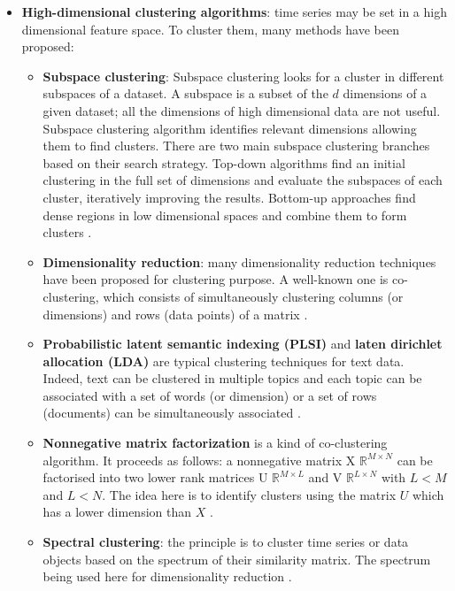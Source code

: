 \begin{itemize}
\item  \textbf{High-dimensional clustering algorithms}: time series may be set in a high dimensional feature space. To cluster them, many methods have been proposed:

\begin{itemize}
	\item  \textbf{Subspace clustering}: Subspace clustering looks for a cluster in 	different subspaces of a dataset.  A subspace is a subset of the $d$ dimensions 		of a given dataset; all the dimensions of high dimensional data are not useful. 	Subspace clustering algorithm identifies relevant dimensions allowing them to 		find clusters. There are two main subspace clustering branches based on their 		search strategy. Top-down algorithms find an initial clustering in the full set 		of dimensions and evaluate the subspaces of each cluster, iteratively improving 	the results. Bottom-up approaches find dense regions in low dimensional spaces 		and combine them to form clusters \cite{parsons2004subspace}.
	\item \textbf{Dimensionality reduction}: many dimensionality reduction 				techniques have been proposed for clustering purpose. A well-known one is co-clustering, which consists of simultaneously clustering  columns (or dimensions) 	and	rows (data points) of a matrix \cite{dhillon2003information}.
	\item \textbf{Probabilistic latent semantic indexing (PLSI)} and \textbf{laten 		dirichlet allocation (LDA)}  are typical clustering techniques for text data. Indeed, text can be clustered in multiple topics and  each topic can be associated with a 		set of words (or dimension) or a set of rows (documents) can be simultaneously associated 			\cite{hofmann2017probabilistic}.
	\item \textbf{Nonnegative matrix factorization} is a kind of co-clustering 			algorithm. It proceeds as follows: a nonnegative matrix X \in $\mathbb{R}^{M			\times N}$ can be 			factorised into two lower rank matrices U \in $			\mathbb{R}^{M\times L}$ and V \in $\mathbb{R}^{L\times N}$ with $L < M$ and $L 		< N$.  The idea here is to identify clusters using the matrix $U$ which has a lower 	dimension than $X$  						\cite{wang2013nonnegative}.
	\item \textbf{Spectral clustering}: the principle is to cluster time series or 		data objects based on the spectrum of their similarity matrix. The spectrum 			being used here for dimensionality reduction  \cite{filippone2008survey}.
	
\end{itemize}
 

\end{itemize}
